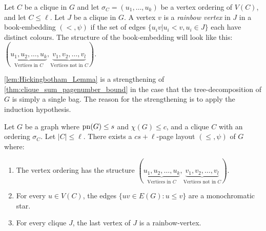 Let \(C\) be a clique in \(G\) and let \(\sigma_C = (u_1, \ldots , u_k)\) be a vertex ordering of \(V(C)\), and let \(C \leq \ell \). Let $J$ be a clique in $G$. A vertex $v$ is a \textit{rainbow vertex} in $J$ in a book-embedding $(<, \psi)$ if the set of edges $\{u_i v | u_i < v, u_i \in J\}$ each have distinct colours. The structure of the book-embedding will look like this: \((\underbrace{u_1, u_2, \ldots, u_k}_{\text{Vertices in } C}, \underbrace{v_1, v_2, \ldots, v_l}_{\text{Vertices not in }C})\).

\cref{lem:Hickingbotham_Lemma} is a strengthening of \cref{thm:clique_sum_pagenumber_bound} in the case that the tree-decomposition of $G$ is simply a single bag. The reason for the strengthening is to apply the induction hypothesis.
\begin{lemma}\label{lem:Hickingbotham_Lemma}
	Let \(G\) be a graph where \(\operatorname{pn}(G) \leq s\) and \(\chi(G) \leq c\), and a clique \(C\) with an ordering \(\sigma_C\). Let \(|C| \leq \ell\). There exists a \(cs + \ell\)-page layout \((\leq, \psi)\) of \(G\) where:
	\begin{enumerate}
		\item The vertex ordering has the structure \((\underbrace{u_1, u_2, \ldots, u_k}_{\text{Vertices in } C}, \underbrace{v_1, v_2, \ldots, v_l}_{\text{Vertices not in }C})\).
		\item For every \(u \in V(C)\), the edges \(\lbrace uv \in E(G) : u \leq v \rbrace\) are a monochromatic star.
		\item For every clique \(J\), the last vertex of \(J\) is a rainbow-vertex.
	\end{enumerate}
\end{lemma}
